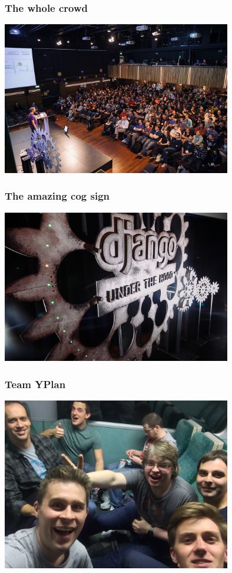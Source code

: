 \documentclass{beamer}
\begin{document}
\begin{frame}[fragile]\frametitle{The whole crowd}

    \begin{center}
        \includegraphics[width=10cm]{duth-attendees}
    \end{center}

\end{frame}


\begin{frame}[fragile]\frametitle{The amazing cog sign}

    \begin{center}
        \includegraphics[width=10cm]{duth-sign}
    \end{center}

\end{frame}


\begin{frame}[fragile]\frametitle{Team YPlan}

    \begin{center}
        \includegraphics[width=10cm]{yplan-team}
    \end{center}

\end{frame}
\end{document}
